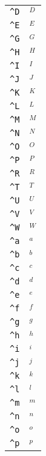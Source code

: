 \begin{longtable}{ll}
\texttt{\textasciicircum D}&${}^D{}$\\
\texttt{\textasciicircum E}&${}^E{}$\\
\texttt{\textasciicircum G}&${}^G{}$\\
\texttt{\textasciicircum H}&${}^H{}$\\
\texttt{\textasciicircum I}&${}^I{}$\\
\texttt{\textasciicircum J}&${}^J{}$\\
\texttt{\textasciicircum K}&${}^K{}$\\
\texttt{\textasciicircum L}&${}^L{}$\\
\texttt{\textasciicircum M}&${}^M{}$\\
\texttt{\textasciicircum N}&${}^N{}$\\
\texttt{\textasciicircum O}&${}^O{}$\\
\texttt{\textasciicircum P}&${}^P{}$\\
\texttt{\textasciicircum R}&${}^R{}$\\
\texttt{\textasciicircum T}&${}^T{}$\\
\texttt{\textasciicircum U}&${}^U{}$\\
\texttt{\textasciicircum V}&${}^V{}$\\
\texttt{\textasciicircum W}&${}^W{}$\\
\texttt{\textasciicircum a}&${}^a{}$\\
\texttt{\textasciicircum b}&${}^b{}$\\
\texttt{\textasciicircum c}&${}^c{}$\\
\texttt{\textasciicircum d}&${}^d{}$\\
\texttt{\textasciicircum e}&${}^e{}$\\
\texttt{\textasciicircum f}&${}^f{}$\\
\texttt{\textasciicircum g}&${}^g{}$\\
\texttt{\textasciicircum h}&${}^h{}$\\
\texttt{\textasciicircum i}&${}^i{}$\\
\texttt{\textasciicircum j}&${}^j{}$\\
\texttt{\textasciicircum k}&${}^k{}$\\
\texttt{\textasciicircum l}&${}^l{}$\\
\texttt{\textasciicircum m}&${}^m{}$\\
\texttt{\textasciicircum n}&${}^n{}$\\
\texttt{\textasciicircum o}&${}^o{}$\\
\texttt{\textasciicircum p}&${}^p{}$\\

\end{longtable}
